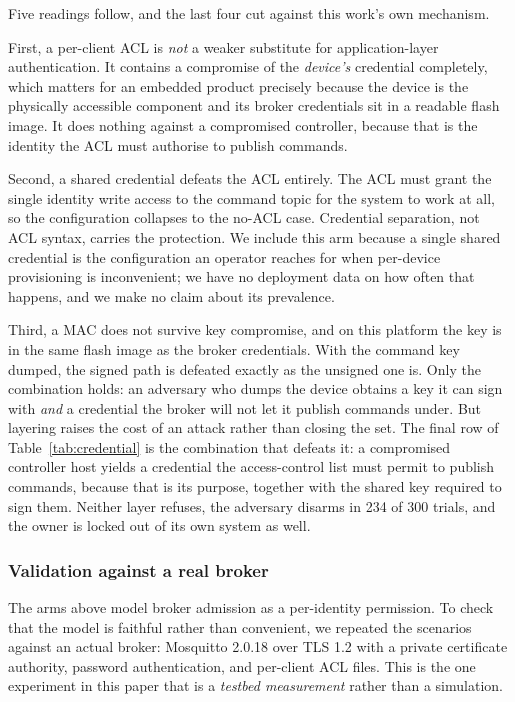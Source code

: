 Five readings follow, and the last four cut against this work's own mechanism.

First, a per-client ACL is \emph{not} a weaker substitute for application-layer authentication.
It contains a compromise of the \emph{device's} credential completely, which matters for an
embedded product precisely because the device is the physically accessible component and its
broker credentials sit in a readable flash image. It does nothing against a compromised
controller, because that is the identity the ACL must authorise to publish commands.

Second, a shared credential defeats the ACL entirely. The ACL must grant the single identity
write access to the command topic for the system to work at all, so the configuration collapses
to the no-ACL case. Credential separation, not ACL syntax, carries the protection. We
include this arm because a single shared credential is the configuration an operator reaches
for when per-device provisioning is inconvenient; we have no deployment data on how often that
happens, and we make no claim about its prevalence.

Third, a MAC does not survive key compromise, and on this platform the key is in the same flash
image as the broker credentials. With the command key dumped, the signed path is defeated
exactly as the unsigned one is. Only the combination holds: an adversary who dumps the device
obtains a key it can sign with \emph{and} a credential the broker will not let it publish
commands under. But layering raises the cost of an attack rather than closing the set. The
final row of Table~\ref{tab:credential} is the combination that defeats it: a compromised
controller host yields a credential the access-control list must permit to publish commands,
because that is its purpose, together with the shared key required to sign them. Neither layer
refuses, the adversary disarms in 234 of 300 trials, and the owner is locked out of its own
system as well.

\subsubsection{Validation against a real broker}
\label{sec:brokerval}

The arms above model broker admission as a per-identity permission. To check that the model is
faithful rather than convenient, we repeated the scenarios against an actual broker: Mosquitto
2.0.18 over TLS 1.2 with a private certificate authority, password authentication, and
per-client ACL files. This is the one experiment in this paper that is a \emph{testbed
measurement} rather than a simulation.

